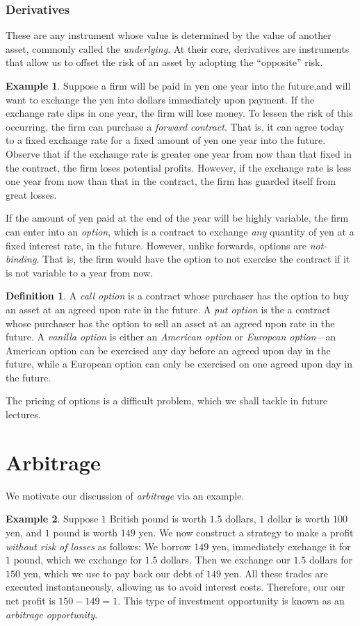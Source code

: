 \documentclass[12pt]{article}
\theoremstyle{plain}
\theoremstyle{definition}
\newtheorem*{definition}{Definition}
\newtheorem*{example}{Example}
\theoremstyle{remark}
\numberwithin{equation}{section}  %
\begin{document}
\subsubsection{Derivatives}
These are any instrument whose value is determined by the value of another asset, commonly called the \emph{underlying}. At their core, derivatives are instruments that allow us to offset the risk of an asset by adopting the ``opposite'' risk.
\begin{example}
    Suppose a firm will be paid in yen one year into the future,and will want to exchange the yen into dollars immediately upon payment.
    If the exchange rate dips in one year, the firm will lose money. To lessen the risk of this occurring, the firm can purchase a \emph{forward contract}. That is, it can agree today to a fixed exchange rate for a fixed amount of yen one year into the future. Observe that if the exchange rate is greater one year from now than that fixed in the contract, the firm loses potential profits. However, if the exchange rate is less one year from now than that in the contract, the firm has guarded itself from great losses. 
\end{example}
If the amount of yen paid at the end of the year will be highly variable, the firm can enter into an \emph{option}, which is a contract to exchange \emph{any} quantity of yen at a fixed interest rate, in the future. However, unlike forwards, options are \emph{not-binding}. That is, the firm would have the option to not exercise the contract if it is not variable to a year from now.
\begin{definition}
    A \emph{call option} is a contract whose purchaser has the option to buy an asset at an agreed upon rate in the future. A \emph{put option} is the a contract whose purchaser has the option to sell an asset at an agreed upon rate in the future. A \emph{vanilla option} is either an \emph{American option} or \emph{European option}---an American option can be exercised any day before an agreed upon day in the future, while a European option can only be exercised on one agreed upon day in the future.
\end{definition}
The pricing of options is a difficult problem, which we shall tackle in future lectures.\section{Arbitrage}
We motivate our discussion of \emph{arbitrage} via an example. 
\begin{example}
Suppose $1$ British pound is worth $1.5$ dollars,  $1$ dollar is worth $100$ yen, 
and $1$ pound is worth $149$ yen.
We now construct a strategy to make a profit \emph{without risk of losses} as follows: 
We borrow $149$ yen, immediately exchange it for $1$ pound, which we exchange for $1.5$ dollars. Then we exchange our $1.5$ dollars for $150$ yen, which we use to pay back our debt of $149$ yen. All these trades are executed instantaneously, allowing us to avoid interest costs. Therefore, our 
our net profit is $150 - 149 = 1$. This type of investment opportunity is known as an
\emph{arbitrage opportunity}.
\end{example}
\end{document}
